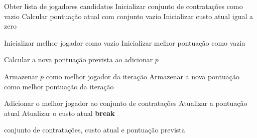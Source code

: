 \begin{algorithm}[H]
\caption{Algoritmo Guloso com estratégia Best Improvement}
\begin{algorithmic}

\State Obter lista de jogadores candidatos
\State Inicializar conjunto de contratações como vazio
\State Calcular pontuação atual com conjunto vazio
\State Inicializar custo atual igual a zero

    \State Inicializar melhor jogador como vazio
    \State Inicializar melhor pontuação como vazia

            \State Calcular a nova pontuação prevista ao adicionar $p$

                \State Armazenar $p$ como melhor jogador da iteração
                \State Armazenar a nova pontuação como melhor pontuação da iteração
            \EndIf
        \EndIf
    \EndFor

        \State Adicionar o melhor jogador ao conjunto de contratações
        \State Atualizar a pontuação atual
        \State Atualizar o custo atual
    \Else
        \State \textbf{break}
    \EndIf
\EndWhile

\State \Return conjunto de contratações, custo atual e pontuação prevista

\end{algorithmic}
\end{algorithm}